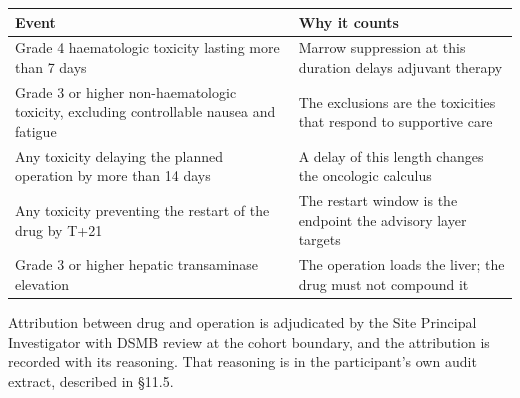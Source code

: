 \noindent\begin{tabularx}{\textwidth}{L{5.2cm} Y}
\toprule
\textbf{Event} & \textbf{Why it counts} \\
\midrule
Grade 4 haematologic toxicity lasting more than 7 days & Marrow suppression at this duration delays adjuvant therapy \\
Grade 3 or higher non-haematologic toxicity, excluding controllable nausea and fatigue & The exclusions are the toxicities that respond to supportive care \\
Any toxicity delaying the planned operation by more than 14 days & A delay of this length changes the oncologic calculus \\
Any toxicity preventing the restart of the drug by T+21 & The restart window is the endpoint the advisory layer targets \\
Grade 3 or higher hepatic transaminase elevation & The operation loads the liver; the drug must not compound it \\
\bottomrule
\end{tabularx}

\vspace{0.30em}

\noindent Attribution between drug and operation is adjudicated by the Site
Principal Investigator with DSMB review at the cohort boundary, and the
attribution is recorded with its reasoning. That reasoning is in the
participant's own audit extract, described in \S 11.5.

